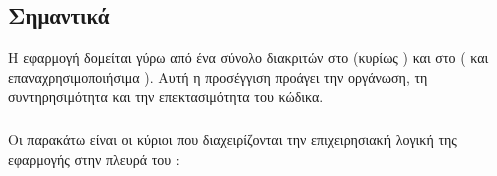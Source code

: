 \subsection{Σημαντικά }
\label{sec:simantika_components_detailed}
Η εφαρμογή δομείται γύρω από ένα σύνολο διακριτών  στο  (κυρίως ) και στο  ( και επαναχρησιμοποιήσιμα ). Αυτή η προσέγγιση προάγει την οργάνωση, τη συντηρησιμότητα και την επεκτασιμότητα του κώδικα.

\subsubsection{}
\label{sec:backend_controllers_detailed}
Οι παρακάτω είναι οι κύριοι  που διαχειρίζονται την επιχειρησιακή λογική της εφαρμογής στην πλευρά του :
